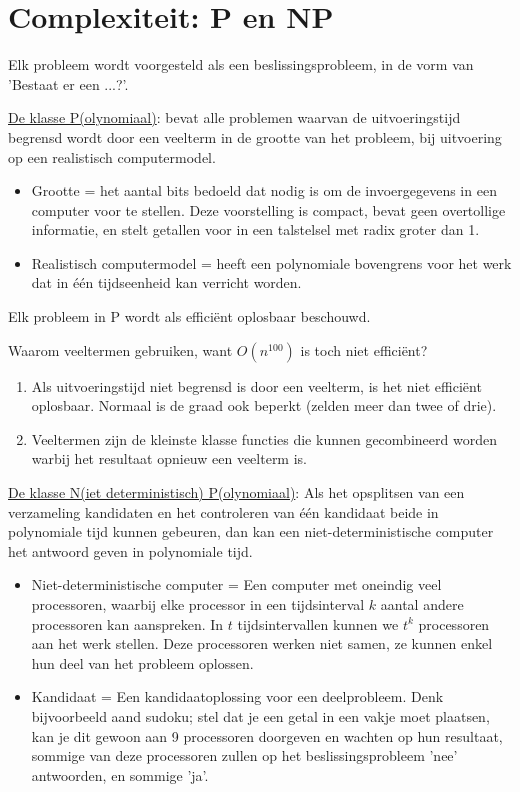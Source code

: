 \documentclass{report}
\begin{document}
\section{Complexiteit: P en NP}
Elk probleem wordt voorgesteld als een beslissingsprobleem, in de vorm van 'Bestaat er een ...?'.

\underline{De klasse P(olynomiaal)}: bevat alle problemen waarvan de uitvoeringstijd begrensd wordt door een veelterm in de grootte van het probleem, bij uitvoering op een realistisch computermodel.
\begin{itemize}
	\item Grootte = het aantal bits bedoeld dat nodig is om de invoergegevens in een computer voor te stellen. Deze voorstelling is compact, bevat geen overtollige informatie, en stelt getallen voor in een talstelsel met radix groter dan 1.
	\item Realistisch computermodel = heeft een polynomiale bovengrens voor het werk dat in één tijdseenheid kan verricht worden. 
\end{itemize}

Elk probleem in P wordt als efficiënt oplosbaar beschouwd.

Waarom veeltermen gebruiken, want $O(n^{100})$ is toch niet efficiënt?
\begin{enumerate}
	\item Als uitvoeringstijd niet begrensd is door een veelterm, is het niet efficiënt oplosbaar. Normaal is de graad ook beperkt (zelden meer dan twee of drie).
	\item Veeltermen zijn de kleinste klasse functies die kunnen gecombineerd worden warbij het resultaat opnieuw een veelterm is. 
\end{enumerate}

\underline{De klasse N(iet deterministisch) P(olynomiaal)}: Als het opsplitsen van een verzameling kandidaten en het controleren van één kandidaat beide in polynomiale tijd kunnen gebeuren, dan kan een niet-deterministische computer het antwoord geven in polynomiale tijd.
\begin{itemize}
	\item Niet-deterministische computer = Een computer met oneindig veel processoren, waarbij elke processor in een tijdsinterval $k$ aantal andere processoren kan aanspreken. In $t$ tijdsintervallen kunnen we $t^k$ processoren aan het werk stellen. Deze processoren werken niet samen, ze kunnen enkel hun deel van het probleem oplossen.
	\item Kandidaat = Een kandidaatoplossing voor een deelprobleem. Denk bijvoorbeeld aand sudoku; stel dat je een getal in een vakje moet plaatsen, kan je dit gewoon aan 9 processoren doorgeven en wachten op hun resultaat, sommige van deze processoren zullen op het beslissingsprobleem 'nee' antwoorden, en sommige 'ja'.
\end{itemize}
\end{document}
